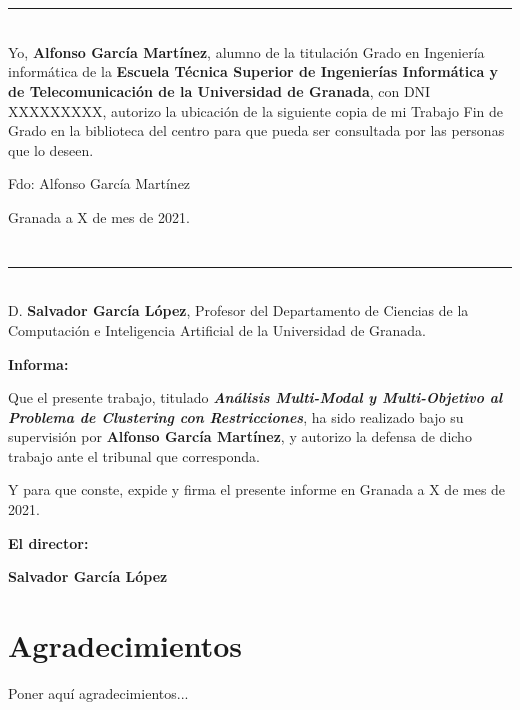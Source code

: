 \chapter*{}
\thispagestyle{empty}

\noindent\rule[-1ex]{\textwidth}{2pt}\\[4.5ex]

Yo, \textbf{Alfonso García Martínez}, alumno de la titulación Grado en Ingeniería informática de la \textbf{Escuela Técnica Superior de Ingenierías Informática y de Telecomunicación de la Universidad de Granada}, con DNI XXXXXXXXX, autorizo la ubicación de la siguiente copia de mi Trabajo Fin de Grado en la biblioteca del centro para que pueda ser consultada por las personas que lo deseen.

\vspace{6cm}

\noindent Fdo: Alfonso García Martínez

\vspace{2cm}

\begin{flushright}
Granada a X de mes de 2021.
\end{flushright}


\chapter*{}
\thispagestyle{empty}

\noindent\rule[-1ex]{\textwidth}{2pt}\\[4.5ex]

D. \textbf{Salvador García López}, Profesor del Departamento de Ciencias de la Computación e Inteligencia Artificial de la Universidad de Granada.

\vspace{0.5cm}

\textbf{Informa:}

\vspace{0.5cm}

Que el presente trabajo, titulado \textit{\textbf{Análisis Multi-Modal y Multi-Objetivo al Problema de Clustering con Restricciones}}, ha sido realizado bajo su supervisión por \textbf{Alfonso García Martínez}, y autorizo la defensa de dicho trabajo ante el tribunal que corresponda.

\vspace{0.5cm}

Y para que conste, expide y firma el presente informe en Granada a X de mes de 2021.

\vspace{1cm}

\textbf{El director:}

\vspace{5cm}

\noindent \textbf{Salvador García López}

\chapter*{Agradecimientos}
\thispagestyle{empty}

       \vspace{1cm}


Poner aquí agradecimientos...

